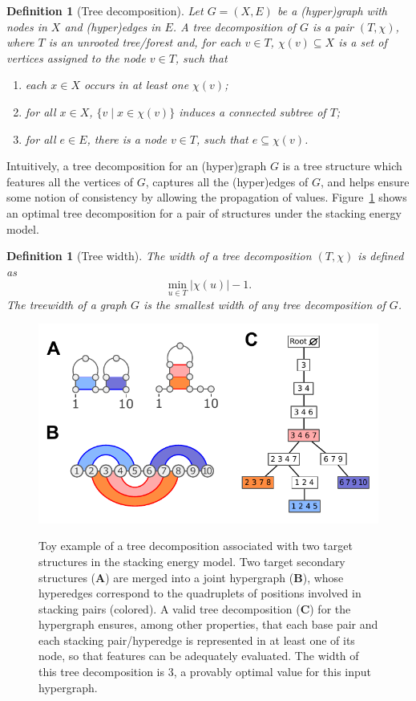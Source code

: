 \documentclass[]{bmcart}
\newtheorem{definition}[theorem]{Definition}
\newcommand{\Def}[1]{\emph{#1}}
\newcommand{\revised}[1]{{\color{red} #1}}
\begin{document}
\begin{definition}[Tree decomposition]
  \label{def:treedecomp}
  Let $G=(X, E)$ be a (hyper)graph with nodes in $X$ and (hyper)edges in $E$. A \Def{tree decomposition} of $G$ is
  a pair $(T,\chi)$, where $T$ is an unrooted tree/forest and, for
  each $v\in T$, $\chi(v)\subseteq X$ is a set of vertices assigned to
  the node $v\in T$, such that
\begin{enumerate}
\item each $x\in X$ occurs in at least one $\chi(v)$;
\item for all $x\in X$, $\{ v \mid x \in \chi(v) \}$ induces a connected subtree of $T$;
\item for all $e\in E$, there is a node $v\in T$, such that $e\subseteq\chi(v)$.
\end{enumerate}
\end{definition}
\revised{Intuitively, a tree decomposition for an (hyper)graph $G$ is a tree structure which features all the vertices of $G$, captures all the (hyper)edges of $G$, and helps ensure some notion of consistency by allowing the propagation of values. Figure~\ref{fig:treedec} shows an optimal tree decomposition for a pair of structures under the stacking energy model.}
\begin{definition}[Tree width]
The \Def{width} of a tree decomposition $(T,\chi)$ is defined as
$$\min_{u\in T} |\chi(u)| - 1.$$ The \Def{treewidth}
of a graph $G$ is the smallest width of any tree decomposition of $G$.
\end{definition}

\begin{figure}
{\centering \includegraphics[width=.9\linewidth]{Figs/example-treedec-stacking}\\}
\caption{\revised{Toy example of a tree decomposition associated with two target structures in the stacking energy model. Two target secondary structures ({\bfseries\sffamily A}) are merged into a joint hypergraph ({\bfseries\sffamily B}), whose hyperedges correspond to the quadruplets of positions involved in stacking pairs (colored). A valid tree decomposition ({\bfseries\sffamily C}) for the hypergraph ensures, among other properties, that each base pair and each stacking pair/hyperedge is represented in at least one of its node, so that features can be adequately evaluated. The width of this tree decomposition is 3, a provably optimal value for this input hypergraph.}\label{fig:treedec}}
\end{figure}
\end{document}
